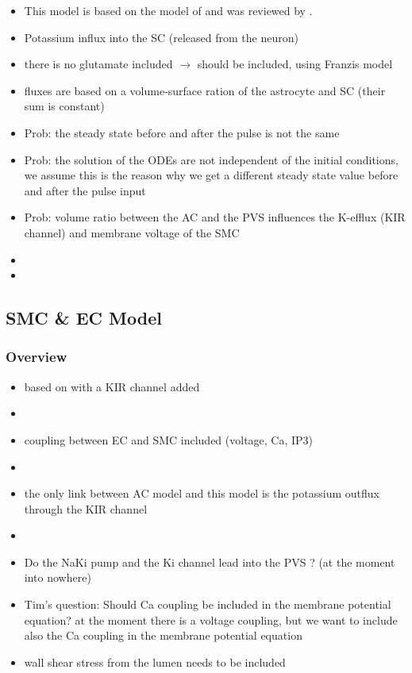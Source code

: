 \begin{itemize}
\item This model is based on the model of \citet{Ostby2009} and was reviewed by  \citet{LoesEvert}.
\item Potassium influx into the SC (released from the neuron)
\item there is no glutamate included $ \rightarrow $ should be included, using Franzis model
\item fluxes are based on a volume-surface ration of the astrocyte and SC (their sum is constant)
\item Prob: the steady state before and after the pulse is not the same
\item Prob: the solution of the ODEs are not independent of the initial conditions, we assume this is the reason why we get a different steady state value before and after the pulse input
\item Prob: volume ratio between the AC and the PVS influences the K-efflux (KIR channel) and membrane voltage of the SMC
\item {}
\item {}
\end{itemize}


\subsection{SMC \& EC Model}
\subsubsection{Overview}


\begin{itemize}
\item based on \cite{Koenigsberger2006} with a KIR channel added
\item {}
\item coupling between EC and SMC included (voltage, Ca, IP3)
\item {}
\item the only link between AC model and this model is the potassium outflux through the KIR channel  
\item {}
\item Do the NaKi pump and the Ki channel lead into the PVS ? (at the moment into nowhere)
\item Tim's question: Should Ca coupling be included in the membrane potential equation? at the moment there is a voltage coupling, but we want to include also the Ca coupling in the membrane potential equation
\item wall shear stress from the lumen needs to be included
\end{itemize}


